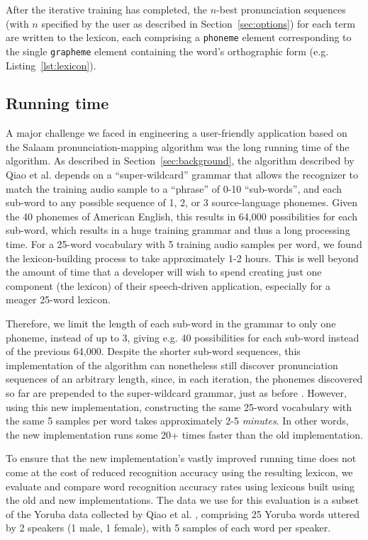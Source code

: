 \documentclass[11pt]{article}
\begin{document}
After the iterative training has completed, the $n$-best pronunciation sequences (with $n$ specified by the user as described in Section~\ref{sec:options}) for each term are written to the lexicon, each comprising a \texttt{phoneme} element corresponding to the single \texttt{grapheme} element containing the word's orthographic form (e.g. Listing~\ref{lst:lexicon}).

\subsection{Running time}
\label{sec:runningtime}

A major challenge we faced in engineering a user-friendly application based on the Salaam pronunciation-mapping algorithm \cite{Qiao10} was the long running time of the algorithm. As described in Section~\ref{sec:background}, the algorithm described by Qiao et al.  depends on a ``super-wildcard'' grammar that allows the recognizer to match the training audio sample to a ``phrase'' of 0-10 ``sub-words'', and each sub-word to any possible sequence of 1, 2, or 3 source-language phonemes. Given the 40 phonemes of American English, this results in 64,000 possibilities for each sub-word, which results in a huge training grammar and thus a long processing time. For a 25-word vocabulary with 5 training audio samples per word, we found the lexicon-building process to take approximately 1-2 hours. This is well beyond the amount of time that a developer will wish to spend creating just one component (the lexicon) of their speech-driven application, especially for a meager 25-word lexicon. 

Therefore, we limit the length of each sub-word in the grammar to only one phoneme, instead of up to 3, giving e.g. 40 possibilities for each sub-word instead of the previous 64,000. Despite the shorter sub-word sequences, this implementation of the algorithm can nonetheless still discover pronunciation sequences of an arbitrary length, since, in each iteration, the phonemes discovered so far are prepended to the super-wildcard grammar, just as before \cite[p.~4]{Qiao10}. However, using this new implementation, constructing the same 25-word vocabulary with the same 5 samples per word takes approximately 2-5 \textit{minutes}. In other words, the new implementation runs some 20+ times faster than the old implementation.

To ensure that the new implementation's vastly improved running time does not come at the cost of reduced recognition accuracy using the resulting lexicon, we evaluate and compare word recognition accuracy rates using lexicons built using the old and new implementations. The data we use for this evaluation is a subset of the Yoruba data collected by Qiao et al. , comprising 25 Yoruba words uttered by 2 speakers (1 male, 1 female), with 5 samples of each word per speaker. 
\end{document}
